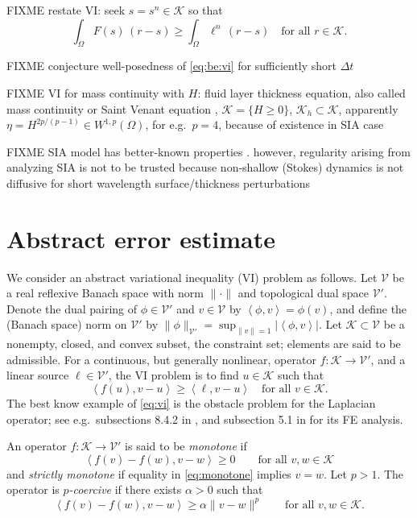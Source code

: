 \documentclass[hidelinks,onefignum,onetabnum,final]{siamart220329}  %
\newcommand{\cK}{\mathcal{K}}
\newcommand{\cV}{\mathcal{V}}
\newcommand{\ip}[2]{\left<#1,#2\right>}
\begin{document}
FIXME restate VI: seek $s = s^n \in \cK$ so that 
\begin{equation}
\int_\Omega F(s)\,(r-s) \ge \int_\Omega \ell^n \,(r-s) \quad \text{for all } r \in \cK. \label{eq:be:vi}
\end{equation}

FIXME conjecture well-posedness of \eqref{eq:be:vi} for sufficiently short $\Delta t$

FIXME VI for mass continuity with $H$: fluid layer thickness equation, also called mass continuity or Saint Venant equation \cite{JouvetBueler2012}, $\cK = \{H\ge 0\}$, $\cK_h \subset \cK$, apparently $\eta = H^{2p/(p-1)} \in W^{1,p}(\Omega)$, for e.g.~$p=4$, because of existence in SIA case \cite{JouvetBueler2012}

FIXME SIA model has better-known properties \cite{JouvetBueler2012,PiersantiTemam2023}. however, regularity arising from analyzing SIA is not to be trusted because non-shallow (Stokes) dynamics is not diffusive for short wavelength surface/thickness perturbations \cite{Pattynetal2008}


\section{Abstract error estimate} \label{sec:abstractestimate}

We consider an abstract variational inequality (VI) \cite{KinderlehrerStampacchia1980} problem as follows.  Let $\cV$ be a real reflexive Banach space with norm $\|\cdot\|$ and topological dual space $\cV'$.  Denote the dual pairing of $\phi \in \cV'$ and $v\in\cV$ by $\ip{\phi}{v} = \phi(v)$, and define the (Banach space) norm on $\cV'$ by $\|\phi\|_{\cV'} = \sup_{\|v\|=1} |\!\ip{\phi}{v}\!|$.  Let $\cK \subset \cV$ be a nonempty, closed, and convex subset, the constraint set; elements are said to be admissible.  For a continuous, but generally nonlinear, operator $f:\cK \to \cV'$, and a linear source $\ell\in \cV'$, the VI problem is to find $u\in \cK$ such that
\begin{equation}
\ip{f(u)}{v-u} \ge \ip{\ell}{v-u} \quad \text{for all } v\in \cK. \label{eq:vi}
\end{equation}
The best know example of \eqref{eq:vi} is the obstacle problem for the Laplacian operator; see e.g.~subsections 8.4.2 in \cite{Evans2010}, and subsection 5.1 in \cite{Ciarlet2002} for its FE analysis.

\begin{definition} \label{def:monotonepcoercive}
An operator $f:\cK \to \cV'$ is said to be \emph{monotone} if
\begin{equation}
\ip{f(v)-f(w)}{v-w} \ge 0 \qquad \text{for all } v,w \in \cK \label{eq:monotone}
\end{equation}
and \emph{strictly monotone} if equality in \eqref{eq:monotone} implies $v=w$.  Let $p>1$.  The operator is \emph{$p$-coercive} \cite{Bueler2021conservation} if there exists $\alpha>0$ such that
\begin{equation}
\ip{f(v)-f(w)}{v-w} \ge \alpha \|v-w\|^p \qquad \text{for all } v,w \in \cK. \label{eq:pcoercive}
\end{equation}
\end{definition}
\end{document}
